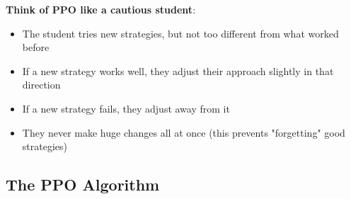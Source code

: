 \documentclass[11pt]{article}
\begin{document}
\begin{intuition}
\textbf{Think of PPO like a cautious student}:
\begin{itemize}
\item The student tries new strategies, but not too different from what worked before
\item If a new strategy works well, they adjust their approach slightly in that direction
\item If a new strategy fails, they adjust away from it
\item They never make huge changes all at once (this prevents "forgetting" good strategies)
\end{itemize}
\end{intuition}

\subsection{The PPO Algorithm}
\end{document}
